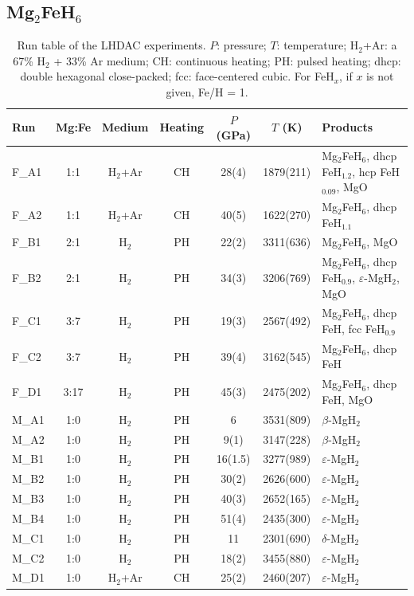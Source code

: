 \documentclass[draft,jgrga,12pt]{agujournal2019}
\begin{document}
\subsection{Mg$_2$FeH$_6$}

\begin{table}[!h]
    \centering
    \caption{Run table of the LHDAC experiments. 
    $P$: pressure; $T$: temperature; H$_2$+Ar: a 67\% H$_2$ + 33\% Ar medium;
    CH: continuous heating; PH: pulsed heating; 
    dhcp: double hexagonal close-packed; fcc: face-centered cubic. 
    For FeH$_x$, if $x$ is not given, Fe/H = 1. }
    {\scriptsize
    \begin{tabular}{lcccccl}
    \hline
     Run   & Mg:Fe & Medium & Heating &$P$ (GPa) & $T$ (K) & Products \\
     \hline
     F\_A1    & 1:1  & H$_2$+Ar & CH & 28(4) & 1879(211) &  Mg$_2$FeH$_6$, dhcp FeH$_{1.2}$, hcp FeH$_{0.09}$, MgO\\
     F\_A2    & 1:1  & H$_2$+Ar  & CH & 40(5) & 1622(270) &  Mg$_2$FeH$_6$, dhcp FeH$_{1.1}$ \\
     F\_B1    & 2:1  & H$_2$  & PH   & 22(2) & 3311(636)&  Mg$_2$FeH$_6$, MgO \\
     F\_B2    & 2:1  & H$_2$ &PH  & 34(3) & 3206(769)&  Mg$_2$FeH$_6$, dhcp FeH$_{0.9}$, $\varepsilon$-MgH$_2$, MgO \\
     F\_C1    & 3:7  & H$_2$ &PH & 19(3) & 2567(492) &  Mg$_2$FeH$_6$, dhcp FeH, fcc FeH$_{0.9}$ \\
     F\_C2    & 3:7  & H$_2$ &PH  & 39(4) & 3162(545) &  Mg$_2$FeH$_6$, dhcp FeH \\
     F\_D1    & 3:17 & H$_2$ &PH & 45(3)& 2475(202) &  Mg$_2$FeH$_6$, dhcp FeH, MgO \\

       M\_A1   & 1:0 & H$_2$ &PH & 6      & 3531(809)  & $\beta$-MgH$_2$ \\
      M\_A2   & 1:0 & H$_2$ &PH & 9(1)   & 3147(228)  & $\beta$-MgH$_2$  \\
      M\_B1  & 1:0 & H$_2$ &PH & 16(1.5) & 3277(989) & $\varepsilon$-MgH$_2$ \\
      M\_B2  & 1:0 & H$_2$ &PH & 30(2)   & 2626(600) & $\varepsilon$-MgH$_2$ \\
      M\_B3  & 1:0 & H$_2$ &PH & 40(3)   & 2652(165) & $\varepsilon$-MgH$_2$ \\
      M\_B4 & 1:0 & H$_2$ &PH  & 51(4)   & 2435(300) & $\varepsilon$-MgH$_2$ \\
      M\_C1  & 1:0 & H$_2$ &PH & 11      & 2301(690) & $\delta$-MgH$_2$ \\
      M\_C2  & 1:0 & H$_2$ &PH & 18(2)   & 3455(880) & $\varepsilon$-MgH$_2$\\
      M\_D1  & 1:0 & H$_2$+Ar &CH & 25(2)   & 2460(207) & $\varepsilon$-MgH$_2$\\
      
     \hline
    \end{tabular}}
    \label{tab:runtable}
\end{table}
\end{document}
